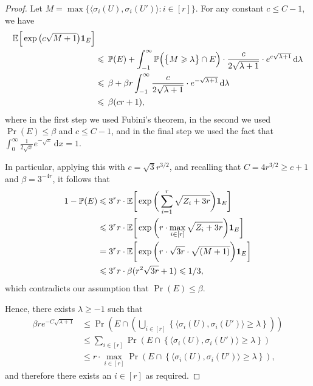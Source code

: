 \begin{proof}
  Let $M = \max \big\{ \big\langle \sigma_i(U),\sigma_i(U') \big\rangle : i \in [r] \big\}$. For any constant $c \le C - 1$, we have
  \begin{align*}
    \Ex\Big[ \exp\big( c \sqrt{M + 1} \big) \mathbf{1}_E \Big]
    & %
    \\
    & \le \, \Pr(E) + \int_{-1}^\infty \Pr\Big( \big\{ M \ge \lambda \big\} \cap E \Big) \cdot \frac{c}{2\sqrt{\lambda + 1}} \cdot e^{c \sqrt{\lambda + 1}} \,\mathrm{d}\lambda\\ %
    & \le \, \beta + \beta r \int_{-1}^\infty \frac{c}{2\sqrt{\lambda + 1}} \cdot e^{- \sqrt{\lambda + 1}} \,\mathrm{d}\lambda\\
    & \le \, \beta (cr + 1),
  \end{align*}
  where in the first step we used Fubini's theorem, in the second we used $\Pr(E) \le \beta$ and $c \le C - 1$, and in the final step we used the fact that $\int_0^\infty \frac{1}{2\sqrt{x}} e^{-\sqrt{x}} \, \mathrm{d}x = 1$.

  In particular, applying this with $c = \sqrt{3}r^{3/2}$, and recalling that $C = 4r^{3/2} \ge c + 1$ and $\beta = 3^{-4r}$, it follows that
  \begin{align}
    1 - \mathbb{P}(E) &\leqslant 3^r r \cdot \mathbb{E}\bigg[ \exp\bigg( \sum_{i = 1}^r \sqrt{ Z_i + 3r } \bigg) \mathbf{1}_E \bigg]\\
    &\leqslant  3^r r \cdot \mathbb{E}\bigg[ \exp\bigg( r \cdot \max_{i \in [r]} \sqrt{ Z_i + 3r } \bigg) \mathbf{1}_E \bigg]\\
    &= 3^r r \cdot \mathbb{E}\bigg[ \exp\bigg( r \cdot \sqrt{ 3r} \cdot \sqrt{ (M + 1) } \bigg) \mathbf{1}_E \bigg]\\
    &\leqslant 3^r r \cdot \beta (r^{2}\sqrt{3r} + 1) \leqslant 1/3,
  \end{align}
  which contradicts our assumption that $\Pr(E) \le \beta$.

  Hence, there exists $\lambda \ge -1$ such that
  \begin{align}\label{eq:max:big:and:E}
    \beta r e^{-C\sqrt{\lambda + 1}} &\le \Pr\left(E \cap \left( \bigcup_{i \in [r]} \left\{ \big\langle \sigma_i(U),\sigma_i(U') \big\rangle \ge \lambda \right\}\right)   \right) \\
    &\le \sum_{i \in [r]} \Pr\left(E \cap \left\{ \big\langle \sigma_i(U),\sigma_i(U') \big\rangle \ge \lambda \right\} \right)\\
    &\le r \cdot \max_{i \in [r]} \Pr\left(E \cap \left\{ \big\langle \sigma_i(U),\sigma_i(U') \big\rangle \ge \lambda \right\} \right) ,
  \end{align}
  and therefore there exists an $i \in [r]$ as required.

\end{proof}





